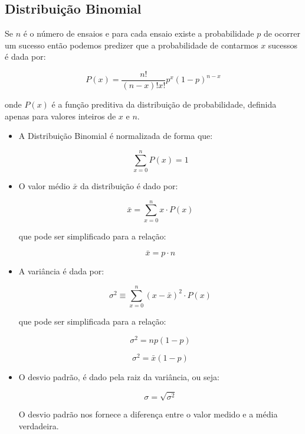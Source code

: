 \documentclass[11pt,a4paper]{article}
\begin{document}
	\subsection{Distribuição Binomial}

		Se $n$ é o número de ensaios e para cada ensaio existe a probabilidade $p$ de ocorrer um sucesso então podemos predizer que a probabilidade de contarmos $x$ sucessos é dada por:

			\begin{equation}
				P(x) = \frac{n!}{(n - x)! x!} p^x (1 - p)^{n - x}
			\end{equation}

		\noindent onde $P(x)$ é a função preditiva da distribuição de probabilidade, definida apenas para valores inteiros de $x$ e $n$. 

		\begin{itemize}
			\item A Distribuição Binomial é normalizada de forma que:

				\begin{equation}
					\sum_{x = 0}^{n} P(x) = 1
				\end{equation}

			\item O valor médio $\bar{x}$ da distribuição é dado por:
				
				\begin{equation}
					\bar{x} = \sum_{x = 0}^{n} x \cdot P(x)
				\end{equation}

				que pode ser simplificado para a relação:

				\begin{equation}
					\bar{x} = p \cdot n
				\end{equation}
			
			\item A variância é dada por:
			
				\begin{equation}
					\sigma^2 \equiv \sum_{x = 0}^{n} (x - \bar{x})^2 \cdot P(x)
				\end{equation}

			que pode ser simplificada para a relação:

				\begin{equation}
					\sigma^2 = np(1 - p)
				\end{equation}

				\begin{equation}
					\sigma^2 = \bar{x}(1 - p)
				\end{equation}

			\item O desvio padrão, é dado pela raiz da variância, ou seja:
			
				\begin{equation}
					\sigma = \sqrt{\sigma^2}
				\end{equation}

			O desvio padrão nos fornece a diferença entre o valor medido e a média verdadeira. 

		\end{itemize}
\end{document}
